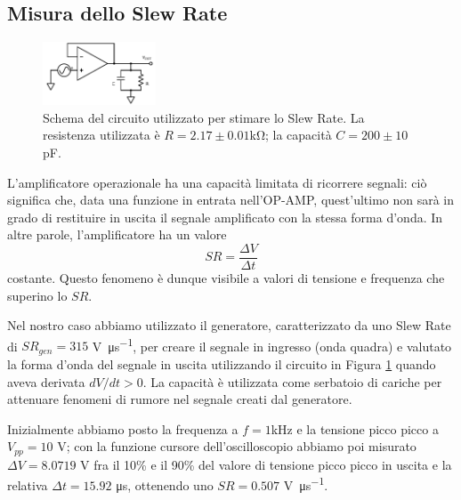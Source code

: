 \subsection{Misura dello Slew Rate}

\begin{figure}
  \begin{center}
    \includegraphics[width=0.30\textwidth]{../E03/latex/slew_rate.pdf}
  \end{center}
  \caption{Schema del circuito utilizzato per stimare lo Slew Rate. La resistenza utilizzata è $R=2.17\pm0.01$\si{\kilo\ohm}; la capacità $C=200 \pm 10$ \si{\pico\farad}.}
  \label{cir3:slew_rate}
\end{figure}

L'amplificatore operazionale ha una capacità limitata di ricorrere segnali: ciò significa che, data una funzione in entrata nell'OP-AMP, quest'ultimo non sarà in grado di restituire in uscita il segnale amplificato con la stessa forma d'onda. In altre parole, l'amplificatore ha un valore
$$SR = \frac{\Delta V}{\Delta t}$$
costante. Questo fenomeno è dunque visibile a valori di tensione e frequenza che superino lo $SR$.

Nel nostro caso abbiamo utilizzato il generatore, caratterizzato da uno Slew Rate di $SR_{gen}=315$ \si{\volt\per\micro\second}, per creare il segnale in ingresso (onda quadra) e valutato la forma d'onda del segnale in uscita utilizzando il circuito in Figura \ref{cir3:slew_rate} quando aveva derivata $dV/dt > 0$. La capacità è utilizzata come serbatoio di cariche per attenuare fenomeni di rumore nel segnale creati dal generatore.

Inizialmente abbiamo posto la frequenza a $f=1$\si{\kilo\hertz} e la tensione picco picco a $V_{pp}=10$ \si{\volt}; con la funzione cursore dell'oscilloscopio abbiamo poi misurato $\Delta V = 8.0719$ \si{\volt} fra il 10\% e il 90\% del valore di tensione picco picco in uscita e la relativa $\Delta t = 15.92$ \si{\micro\second}, ottenendo uno $SR=0.507$ \si{\volt\per\micro\second}.

